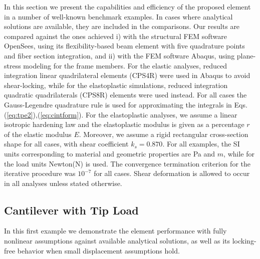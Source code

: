 In this section we present the capabilities and efficiency of the proposed
element in a number of well-known benchmark examples. In cases where analytical
solutions are available, they are included in the comparisons. Our results are
compared against the ones achieved i) with the structural FEM software
OpenSees\cite{OpenSees}, using its flexibility-based beam element
\cite{Neuenhofer,Neuenhofer2} with five quadrature points and fiber section
integration, and ii) with the FEM software Abaqus\cite{Abaqus}, using
plane-stress modeling for the frame members. For the
elastic analyses, reduced integration linear quadrilateral elements (CPS4R) were
used in Abaqus to avoid shear-locking, while for the elastoplastic
simulations, reduced integration quadratic quadrilaterals (CPS8R) elements
were used instead. For all cases the Gauss-Legendre
quadrature rule is used for approximating the integrals in Eqs.
(\ref{eq:tpe2}),(\ref{eq:cintform}). For the elastoplastic analyses, we assume
a linear isotropic hardening law and the elastoplastic modulus is given
as a percentage $r$ of the elastic modulus $E$. Moreover, we assume a
rigid rectangular cross-section shape for all cases, with shear coefficient
$k_s=0.870$\cite{Cowper}. For all examples, the SI units corresponding to
material and geometric properties are Pa and $m$, while for the load units
Newton(N) is used. The convergence termination criterion for the iterative
procedure was $10^{-7}$ for all cases. Shear deformation is
allowed to occur in all analyses unless stated otherwise.


\subsection{Cantilever with Tip Load}\label{CANTIPROB}

In this first example we demonstrate the element performance with fully 
nonlinear assumptions against available analytical solutions, 
as well as its locking-free behavior when small displacement assumptions
hold.

